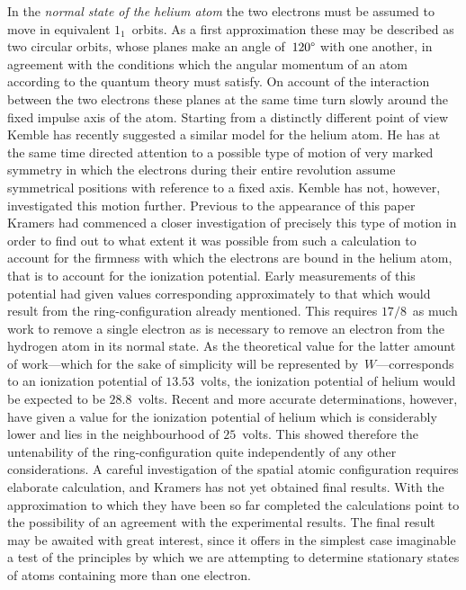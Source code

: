 In the \emph{normal state of the helium atom} the two electrons must
be assumed to move in equivalent $1_{1}$~orbits. As a first approximation
these may be described as two circular orbits, whose planes make
an angle of~$120\mbox{\textdegree}$ with one another, in agreement with the conditions
which the angular momentum of an atom according to the quantum
theory must satisfy. On account of the interaction between the
two electrons these planes at the same time turn slowly around
the fixed impulse axis of the atom. Starting from a distinctly
different point of view Kemble has recently suggested a similar
model for the helium atom. He has at the same time directed
attention to a possible type of motion of very marked symmetry
in which the electrons during their entire revolution assume
symmetrical positions with reference to a fixed axis. Kemble has
not, however, investigated this motion further. Previous to the
appearance of this paper Kramers had commenced a closer investigation
of precisely this type of motion in order to find out to what
extent it was possible from such a calculation to account for the
firmness with which the electrons are bound in the helium atom,
that is to account for the ionization potential. Early measurements
of this potential had given values corresponding approximately to
that which would result from the ring-configuration already mentioned.
This requires $17/8$~as much work to remove a single
electron as is necessary to remove an electron from the hydrogen
atom in its normal state. As the theoretical value for the latter
amount of work---which for the sake of simplicity will be represented
by~$W$---corresponds to an ionization potential of $13.53$~volts,
the ionization potential of helium would be expected to be $28.8$~volts.
Recent and more accurate determinations, however, have
given a value for the ionization potential of helium which is considerably
lower and lies in the neighbourhood of $25$~volts. This
showed therefore the untenability of the ring-configuration quite
independently of any other considerations. A careful investigation of
the spatial atomic configuration requires elaborate calculation, and
Kramers has not yet obtained final results. With the approximation
to which they have been so far completed the calculations point to
the possibility of an agreement with the experimental results. The
final result may be awaited with great interest, since it offers in
the simplest case imaginable a test of the principles by which we
are attempting to determine stationary states of atoms containing
more than one electron.

